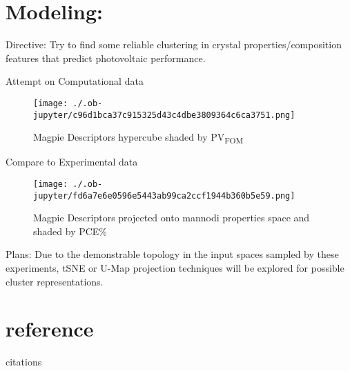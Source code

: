 \documentclass[9pt, compress]{beamer}
\begin{document}
\section{Modeling:}
\label{sec:org553edfb}
\begin{frame}[allowframebreaks]{Directive:}
Try to find some reliable clustering in crystal properties/composition
features that predict photovoltaic performance.
\begin{block}{Attempt on Computational data}
\begin{figure}[htbp]
\centering
\texttt{[image: ./.ob-jupyter/c96d1bca37c915325d43c4dbe3809364c6ca3751.png]}
\caption{\label{fig:prop_top} Magpie Descriptors hypercube shaded by PV\textsubscript{FOM}}
\end{figure}
\end{block}
\begin{block}{Compare to Experimental data}
\begin{figure}[htbp]
\centering
\texttt{[image: ./.ob-jupyter/fd6a7e6e0596e5443ab99ca2ccf1944b360b5e59.png]}
\caption{\label{fig:prop_top} Magpie Descriptors projected onto mannodi properties space and shaded by PCE\%}
\end{figure}
\end{block}
\end{frame}

\begin{frame}[label={sec:orgdebe79a}]{Plans:}
Due to the demonstrable topology in the input spaces sampled by these
experiments, tSNE or U-Map projection techniques will be explored for
possible cluster representations.
\end{frame}
\section{reference}
\label{sec:org1ac50a4}
\begin{frame}[label={sec:org94a0c7d}]{citations}


\end{frame}
\end{document}
